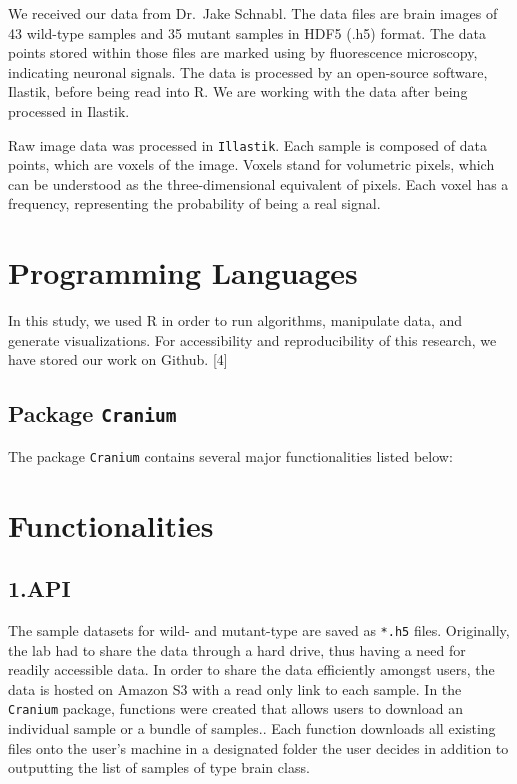 \documentclass[10pt,letterpaper]{article}
\begin{document}
We received our data from Dr.~Jake Schnabl. The data files are brain
images of 43 wild-type samples and 35 mutant samples in HDF5 (.h5)
format. The data points stored within those files are marked using by
fluorescence microscopy, indicating neuronal signals. The data is
processed by an open-source software, Ilastik, before being read into R.
We are working with the data after being processed in Ilastik.

Raw image data was processed in \texttt{Illastik}. Each sample is
composed of data points, which are voxels of the image. Voxels stand for
volumetric pixels, which can be understood as the three-dimensional
equivalent of pixels. Each voxel has a frequency, representing the
probability of being a real signal.

\hypertarget{programming-languages}{%
\section{Programming Languages}\label{programming-languages}}

In this study, we used R in order to run algorithms, manipulate data,
and generate visualizations. For accessibility and reproducibility of
this research, we have stored our work on Github. {[}4{]}

\hypertarget{package-cranium}{%
\subsection{\texorpdfstring{Package
\texttt{Cranium}}{Package Cranium}}\label{package-cranium}}

The package \texttt{Cranium} contains several major functionalities
listed below:

\hypertarget{functionalities}{%
\section{Functionalities}\label{functionalities}}

\hypertarget{api}{%
\subsection{1.API}\label{api}}

The sample datasets for wild- and mutant-type are saved as \texttt{*.h5}
files. Originally, the lab had to share the data through a hard drive,
thus having a need for readily accessible data. In order to share the
data efficiently amongst users, the data is hosted on Amazon S3 with a
read only link to each sample. In the \texttt{Cranium} package,
functions were created that allows users to download an individual
sample or a bundle of samples.. Each function downloads all existing
files onto the user's machine in a designated folder the user decides in
addition to outputting the list of samples of type brain class.
\end{document}
